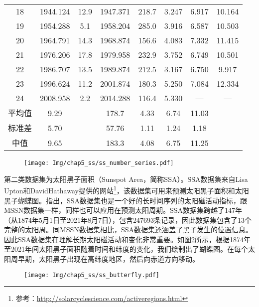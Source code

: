 \begin{table}[!htbp]
\begin{tabular}{cccccccc}
    18 & 1944.124 & 12.9 & 1947.371 & 218.7 & 3.247 & 6.917 & 10.164 \\
    19 & 1954.288 & 5.1 & 1958.204 & 285.0 & 3.916 & 6.587 & 10.503 \\
    20 & 1964.791 & 14.3 & 1968.874 & 156.6 & 4.083 & 7.332 & 11.415 \\
    21 & 1976.206 & 17.8 & 1979.958 & 232.9 & 3.752 & 6.749 & 10.501 \\
    22 & 1986.707 & 13.5 & 1989.874 & 212.5 & 3.167 & 6.750 & 9.917 \\
    23 & 1996.624 & 11.2 & 2001.874 & 180.3 & 5.250 & 7.084 & 12.334  \\
    24 & 2008.958 & 2.2 & 2014.288 & 116.4 & 5.330 & — & —  \\
    平均值 & 9.29 &  & 178.7 & 4.33 & 6.74 & 11.03  \\
    标准差 & 5.70 &  & 57.76 & 1.11 & 1.24 & 1.18 \\
    中值 & 9.65 &  & 183.3 & 4.08 & 6.75 & 11.25 \\
    \bottomrule
  \end{tabular}
\end{table}

\begin{figure}[!htbp]
    \centering
    \texttt{[image: Img/chap5\_ss/ss\_number\_series.pdf]}
    \vspace{-1.4cm}
    \label{fig:ss_number_series}
  \end{figure}

第二类数据集为太阳黑子面积（Sunspot Area，简称SSA）。SSA数据集来自Lisa Upton和DavidHathaway提供的网站\footnote{参考：\href{http://solarcyclescience.com/activeregions.html}{http://solarcyclescience.com/activeregions.html}}，该数据集可用来预测太阳黑子面积和太阳黑子蝴蝶图。\citet{hathaway2015solar}指出，SSA数据集也是一个好的长时间序列的太阳磁活动指标，跟MSSN数据集一样，同样也可以应用在预测太阳周期。SSA数据集跨越了147年（从1874年5月1日至2021年8月7日），包含247693条记录，因此数据集包含了13个完整的太阳周。同MSSN数据集相比，SSA数据集还涵盖了黑子发生的位置信息。因此SSA数据集在理解长期太阳磁活动和变化非常重要。如图\ref{fig:ss_butterfly}所示，根据1874年至2021年间太阳黑子面积随着时间和纬度的变化，我们绘制出了蝴蝶图。在每个太阳周早期，太阳黑子出现在高纬度地区，然后向赤道方向移动。

\begin{figure}[!htbp]
  \vspace{-0.3cm}
  \centering
  \texttt{[image: Img/chap5\_ss/ss\_butterfly.pdf]}
  \vspace{-1.4cm}
  \label{fig:ss_butterfly}
\end{figure}

